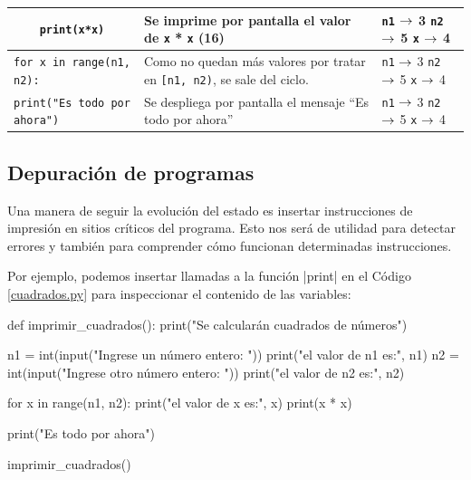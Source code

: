 \begin{longtable}[c]{|p{5.5cm}|p{5.5cm}|p{1.5cm}|}
\hline
\lstinline+    print(x*x)+
&
Se imprime por pantalla el valor de \lstinline!x! * \lstinline!x! (16)
&
\lstinline!n1! $\rightarrow$ 3 \newline
\lstinline!n2! $\rightarrow$ 5 \newline
\lstinline!x! $\rightarrow$ 4 \\

\hline
\lstinline+for x in range(n1, n2):+
&
Como no quedan más valores por tratar en \lstinline![n1, n2)!,
se sale del ciclo.
&
\lstinline!n1! $\rightarrow$ 3 \newline
\lstinline!n2! $\rightarrow$ 5 \newline
\lstinline!x! $\rightarrow$ 4 \\

\hline
\lstinline+print("Es todo por ahora")+
&
Se despliega por pantalla el mensaje ``Es todo por ahora''
&
\lstinline!n1! $\rightarrow$ 3 \newline
\lstinline!n2! $\rightarrow$ 5 \newline
\lstinline!x! $\rightarrow$ 4 \\

\hline
\end{longtable}

\subsection{Depuración de programas}

Una manera de seguir la evolución del estado es insertar instrucciones de impresión
en sitios críticos del programa. Esto nos será de utilidad para detectar errores
y también para comprender cómo funcionan determinadas instrucciones.

Por ejemplo, podemos insertar llamadas a la función |print| en el Código
\ref{cuadrados.py} para inspeccionar el contenido de las variables:

\begin{codigo-python-sn}
def imprimir_cuadrados():
    print("Se calcularán cuadrados de números")

    n1 = int(input("Ingrese un número entero: "))
    print("el valor de n1 es:", n1)
    n2 = int(input("Ingrese otro número entero: "))
    print("el valor de n2 es:", n2)

    for x in range(n1, n2):
        print("el valor de x es:", x)
        print(x * x)

    print("Es todo por ahora")

imprimir_cuadrados()
\end{codigo-python-sn}

